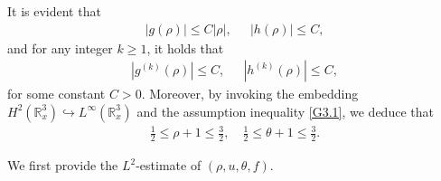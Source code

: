 \documentclass[reqno,11pt]{amsart}
\theoremstyle{plain}
\numberwithin{equation}{section}
\begin{document}
It is evident that  
\begin{align*}
|g(\rho)|\leq C|\rho|,\ \ \quad |h(\rho)|\leq C, 
\end{align*}
and for any integer $k\geq 1$, it holds that
\begin{align*}
|g^{(k)}(\rho)|\leq C,\  \ \quad |h^{(k)}(\rho)|\leq C,
\end{align*}
for some constant $C>0$. Moreover, by invoking the embedding $H^2(\mathbb{R}^3_x) \hookrightarrow L^{\infty}(\mathbb{R}^3_x)$ and 
the assumption inequality \eqref{G3.1}, we deduce that  
 \begin{align}\label{LNXG3.2}  
\frac{1}{2} \leq \rho + 1 \leq \frac{3}{2}, \quad \frac{1}{2}\leq\theta+1\leq \frac{3}{2}.  
\end{align} 

We first provide the $L^2$-estimate of     $(\rho, u, \theta, f)$.
\end{document}
